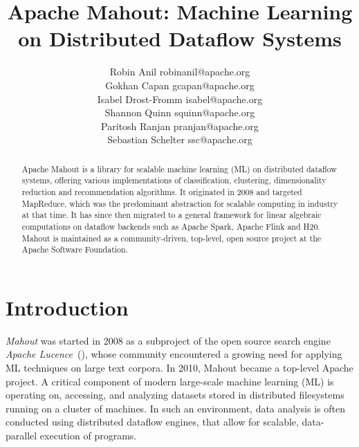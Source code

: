 \documentclass[twoside,11pt]{article}
\begin{document}
\title{Apache Mahout: Machine Learning on Distributed Dataflow Systems}

\author{\name Robin Anil \email robinanil@apache.org\\
  \name Gokhan Capan \email gcapan@apache.org\\
  \name Isabel Drost-Fromm \email isabel@apache.org\\
  \name Shannon Quinn \email squinn@apache.org\\
  \name Paritosh Ranjan \email pranjan@apache.org\\
  \name Sebastian Schelter \email ssc@apache.org\\
}

\editor{}

\maketitle

\begin{abstract}%
Apache Mahout is a library for scalable machine learning (ML) on distributed dataflow systems, offering various implementations of classification, clustering, dimensionality reduction and recommendation algorithms. It originated in 2008 and targeted MapReduce, which was the predominant abstraction for scalable computing in industry at that time. It has since then migrated to a general framework for linear algebraic computations on dataflow backends such as Apache Spark, Apache Flink and H20. Mahout is maintained as a community-driven, top-level, open source project at the Apache Software Foundation. 
\end{abstract}


\section{Introduction}

\textit{Mahout} was started in 2008 as a subproject of the open source search engine \textit{Apache Lucence}~(\cite{Owen2012,Mccandless2010}), whose community encountered a growing need for applying ML techniques on large text corpora. In 2010, Mahout became a top-level Apache project. A critical component of modern large-scale machine learning (ML) is operating on, accessing, and analyzing datasets stored in distributed filesystems running on a cluster of machines. In such an environment, data analysis is often conducted using distributed dataflow engines, that allow for scalable, data-parallel execution of programs.
\end{document}
